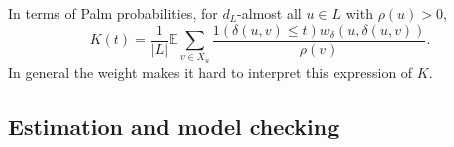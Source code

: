 \documentclass[alpha-refs]{wiley-article}
\begin{document}
In terms of Palm probabilities, for $d_L$-almost all $u\in L$ with $\rho(u)>0$,
\[K(t)=\frac{1}{|L|}\mathbb E \sum_{v\in X_u}\frac{1(\delta(u,v)\le t)w_\delta(u,\delta(u,v))}{\rho(v)}.\]
In general
the weight makes it hard to interpret this expression of $K$. %
 

\subsection{Estimation and model checking}\label{s:est-check} %

%
%
%
 
\end{document}
